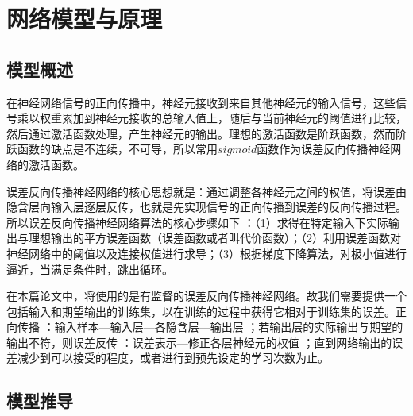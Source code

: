 \chapter{网络模型与原理}
\label{cha:algorithm}

\section{模型概述}
在神经网络信号的正向传播中，神经元接收到来自其他神经元的输入信号，这些信号乘以权重累加到神经元接收的总输入值上，随后与当前神经元的阈值进行比较，然后通过激活函数处理，产生神经元的输出。理想的激活函数是阶跃函数，然而阶跃函数的缺点是不连续，不可导，所以常用$sigmoid$函数作为误差反向传播神经网络的激活函数。

误差反向传播神经网络的核心思想就是：通过调整各神经元之间的权值，将误差由隐含层向输入层逐层反传，也就是先实现信号的正向传播到误差的反向传播过程。所以误差反向传播神经网络算法的核心步骤如下 ：（1）求得在特定输入下实际输出与理想输出的平方误差函数（误差函数或者叫代价函数）；（2）利用误差函数对神经网络中的阈值以及连接权值进行求导；（3）根据梯度下降算法，对极小值进行逼近，当满足条件时，跳出循环。

在本篇论文中，将使用的是有监督的误差反向传播神经网络。故我们需要提供一个包括输入和期望输出的训练集，以在训练的过程中获得它相对于训练集的误差。正向传播 ：输入样本—输入层—各隐含层—输出层 ；若输出层的实际输出与期望的输出不符，则误差反传 ：误差表示—修正各层神经元的权值 ；直到网络输出的误差减少到可以接受的程度，或者进行到预先设定的学习次数为止。

\section{模型推导}

